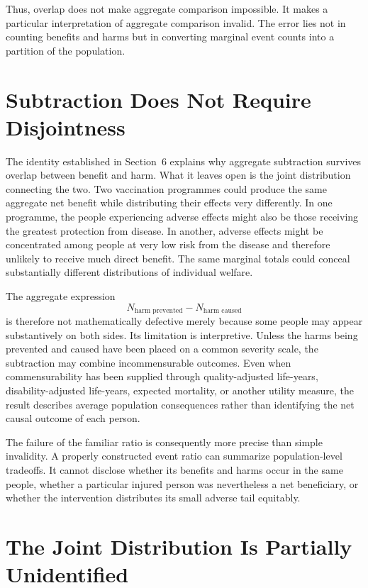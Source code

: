 \documentclass[11pt]{article}
\begin{document}
Thus, overlap does not make aggregate comparison impossible. It makes a particular interpretation of aggregate comparison invalid. The error lies not in counting benefits and harms but in converting marginal event counts into a partition of the population.

\section{Subtraction Does Not Require Disjointness}

The identity established in Section~6 explains why aggregate subtraction survives overlap between benefit and harm. What it leaves open is the joint distribution connecting the two. Two vaccination programmes could produce the same aggregate net benefit while distributing their effects very differently. In one programme, the people experiencing adverse effects might also be those receiving the greatest protection from disease. In another, adverse effects might be concentrated among people at very low risk from the disease and therefore unlikely to receive much direct benefit. The same marginal totals could conceal substantially different distributions of individual welfare.

The aggregate expression
\[
N_{\text{harm prevented}} - N_{\text{harm caused}}
\]
is therefore not mathematically defective merely because some people may appear substantively on both sides. Its limitation is interpretive. Unless the harms being prevented and caused have been placed on a common severity scale, the subtraction may combine incommensurable outcomes. Even when commensurability has been supplied through quality-adjusted life-years, disability-adjusted life-years, expected mortality, or another utility measure, the result describes average population consequences rather than identifying the net causal outcome of each person.

The failure of the familiar ratio is consequently more precise than simple invalidity. A properly constructed event ratio can summarize population-level tradeoffs. It cannot disclose whether its benefits and harms occur in the same people, whether a particular injured person was nevertheless a net beneficiary, or whether the intervention distributes its small adverse tail equitably.

\section{The Joint Distribution Is Partially Unidentified}
\end{document}
